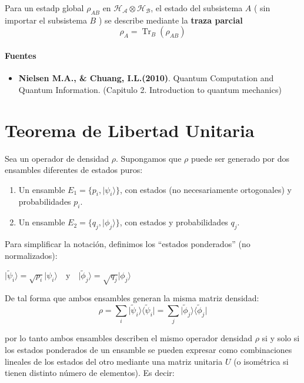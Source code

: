 \documentclass[11pt]{article}
\providecommand{\tightlist}{%
      \setlength{\itemsep}{0pt}\setlength{\parskip}{0pt}}
\begin{document}
Para un estadp global
\(\rho_{AB} \text{ en } \mathcal{H_A} \otimes \mathcal{H_B}\), el estado
del subsistema \(A\) ( sin importar el subsistema \(B\) ) se describe
mediante la \textbf{traza parcial}
\[\rho_A = \operatorname{Tr}_B(\rho_{AB})\]

    \paragraph{Fuentes}\label{fuentes}

\begin{itemize}
\tightlist
\item
  \textbf{Nielsen M.A., \& Chuang, I.L.(2010)}. Quantum Computation and
  Quantum Information. (Capitulo 2. Introduction to quantum mechanics)
\end{itemize}

    \section{Teorema de Libertad
Unitaria}\label{teorema-de-libertad-unitaria}

Sea un operador de densidad \(\rho\). Supongamos que \(\rho\) puede ser
generado por dos ensambles diferentes de estados puros:

\begin{enumerate}
\def\labelenumi{\arabic{enumi}.}
\tightlist
\item
  Un ensamble \(E_1 = \{p_i, \vert{}\psi_i\rangle\}\), con estados (no
  necesariamente ortogonales) y probabilidades \(p_i\).
\item
  Un ensamble \(E_2 = \{q_j, \vert{}\phi_j\rangle\}\), con estados y
  probabilidades \(q_j\).
\end{enumerate}

Para simplificar la notación, definimos los ``estados ponderados'' (no
normalizados):

\(\vert{}\tilde{\psi}_i\rangle = \sqrt{p_i} \vert{}\psi_i\rangle \quad \text{y} \quad \vert{}\tilde{\phi}_j\rangle = \sqrt{q_j} \vert{}\phi_j\rangle\)

De tal forma que ambos ensambles generan la misma matriz densidad:
\[\rho = \sum_i \vert{}\tilde{\psi}_i\rangle \langle \tilde{\psi}_i\vert{} = \sum_j \vert{}\tilde{\phi}_j\rangle \langle \tilde{\phi}_j\vert{}\]

por lo tanto ambos ensambles describen el mismo operador densidad
\(\rho\) si y solo si los estados ponderados de un ensamble se pueden
expresar como combinaciones lineales de los estados del otro mediante
una matriz unitaria \(U\) (o isométrica si tienen distinto número de
elementos). Es decir:
\end{document}
